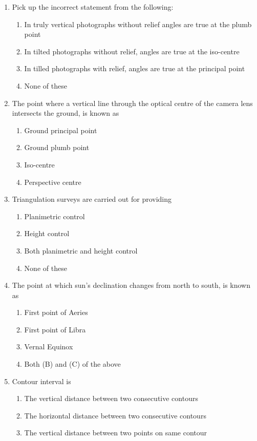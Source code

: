 \documentclass[11pt,a4paper]{article}
\begin{document}
\begin{enumerate}
\item{Pick up the incorrect statement from the following:}
\begin{enumerate}[label=\Alph*.]
\item{In truly vertical photographs without relief angles are true at the plumb point}
\item{In tilted photographs without relief, angles are true at the iso-centre}
\item{In tilled photographs with relief, angles are true at the principal point}
\item{None of these}
\end{enumerate}
\item{The point where a vertical line through the optical centre of the camera lens intersects the ground, is known as}
\begin{enumerate}[label=\Alph*.]
\item{Ground principal point}
\item{Ground plumb point}
\item{Iso-centre}
\item{Perspective centre}
\end{enumerate}
\item{Triangulation surveys are carried out for providing}
\begin{enumerate}[label=\Alph*.]
\item{Planimetric control}
\item{Height control}
\item{Both planimetric and height control}
\item{None of these}
\end{enumerate}
\item{The point at which sun's declination changes from north to south, is known as}
\begin{enumerate}[label=\Alph*.]
\item{First point of Aeries}
\item{First point of Libra}
\item{Vernal Equinox}
\item{Both (B) and (C) of the above}
\end{enumerate}
\item{Contour interval is}
\begin{enumerate}[label=\Alph*.]
\item{The vertical distance between two consecutive contours}
\item{The horizontal distance between two consecutive contours}
\item{The vertical distance between two points on same contour}

\end{enumerate}
\end{enumerate}
\end{document}
